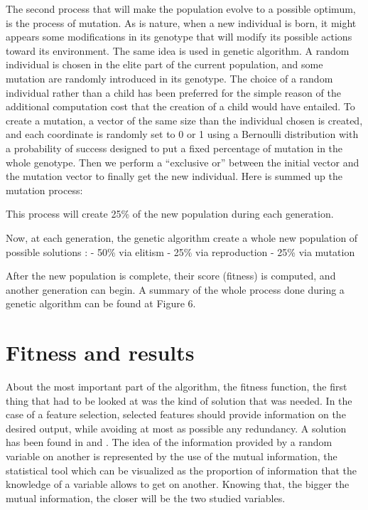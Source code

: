 \documentclass{report}
\begin{document}
		The second process that will make the population evolve to a possible optimum, is the process of mutation. As is nature, when a new individual is born, it might appears some modifications in its genotype that will modify its possible actions toward its environment. The same idea is used in genetic algorithm. A random individual is chosen in the elite part of the current population, and some mutation are randomly introduced in its genotype. The choice of a random individual rather than a child has been preferred for the simple reason of the additional computation cost that the creation of a child would have entailed. To create a mutation, a vector of the same size than the individual chosen is created, and each coordinate is randomly set to 0 or 1 using a Bernoulli distribution with a probability of success designed to put a fixed percentage of mutation in the whole genotype. Then we perform a “exclusive or” between the initial vector and the mutation vector to finally get the new individual. Here is summed up the mutation process:
		
		
		
		This process will create 25\% of the new population during each generation.
		
		
		Now, at each generation, the genetic algorithm create a whole new population of possible solutions :
		- 50\% via elitism
		- 25\% via reproduction
		- 25\% via mutation
		
		After the new population is complete, their score (fitness) is computed, and another generation can begin. A summary of the whole process done during a genetic algorithm can be found at Figure 6.
		
		\section{Fitness and results}
		
			About the most important part of the algorithm, the fitness function, the first thing that had to be looked at was the kind of solution that was needed. In the case of a feature selection, selected features should provide information on the desired output, while avoiding at most as possible any redundancy. A solution has been found in \cite{huang2007hybrid} and \cite{chahkandifeature}. The idea of the information provided by a random variable on another is represented by the use of the mutual information, the statistical tool which can be visualized as the proportion of information that the knowledge of a variable allows to get on another. Knowing that, the bigger the mutual information, the closer will be the two studied variables.
			
\end{document}
